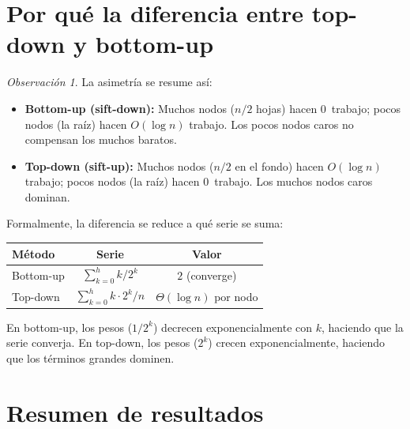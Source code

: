 \documentclass[11pt, letterpaper]{article}
\theoremstyle{definition}
\theoremstyle{plain}
\theoremstyle{remark}
\newtheorem{remark}{Observación}[section]
\begin{document}
\section{Por qué la diferencia entre top-down y bottom-up}

\begin{remark}
La asimetría se resume así:
\begin{itemize}
  \item \textbf{Bottom-up (sift-down):} Muchos nodos ($n/2$ hojas)
    hacen 0~trabajo; pocos nodos (la raíz) hacen $O(\log n)$ trabajo.
    Los pocos nodos caros no compensan los muchos baratos.
  \item \textbf{Top-down (sift-up):} Muchos nodos ($n/2$ en el fondo)
    hacen $O(\log n)$ trabajo; pocos nodos (la raíz) hacen 0~trabajo.
    Los muchos nodos caros dominan.
\end{itemize}
\end{remark}

Formalmente, la diferencia se reduce a qué serie se suma:

\begin{table}[h]
\centering
\begin{tabular}{lcc}
\toprule
\textbf{Método} & \textbf{Serie} & \textbf{Valor} \\
\midrule
Bottom-up & $\displaystyle\sum_{k=0}^{h} k / 2^k$ & $2$ (converge) \\[6pt]
Top-down  & $\displaystyle\sum_{k=0}^{h} k \cdot 2^k / n$
          & $\Theta(\log n)$ por nodo \\
\bottomrule
\end{tabular}
\end{table}

En bottom-up, los pesos ($1/2^k$) decrecen exponencialmente con $k$,
haciendo que la serie converja. En top-down, los pesos ($2^k$) crecen
exponencialmente, haciendo que los términos grandes dominen.

\section{Resumen de resultados}
\end{document}
